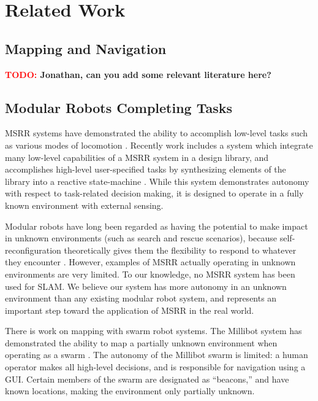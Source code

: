 \documentclass[conference]{IEEEtran}
\newcommand{\TODO}[1]{ {\bf \textcolor{red}{TODO:} #1 }}
\begin{document}

\section{Related Work}\label{sec:related-work}
%

\subsection{Mapping and Navigation}\label{mapping-and-navigation}

\TODO{Jonathan, can you add some relevant literature here?}

\subsection{Modular Robots Completing Tasks}
%
MSRR systems have demonstrated the ability to accomplish low-level tasks such as  various modes of locomotion \cite{Yim1994}.
Recently work includes a system which integrate many low-level capabilities of a MSRR system in a design library, and accomplishes high-level user-specified tasks by synthesizing elements of the library into a reactive state-machine \cite{Jing2016}. While this system demonstrates autonomy with respect to task-related decision making, it is designed to operate in a fully known environment with external sensing.

Modular robots have long been regarded as having the potential to make impact in unknown environments (such as search and rescue scenarios), because  self-reconfiguration theoretically gives them the flexibility to respond to whatever they encounter \cite{Yim2007a,Yim2000}.  However, examples of MSRR actually operating in unknown environments are very limited. To our knowledge, no MSRR system has been used for SLAM. We believe our system has more autonomy in an unknown environment than any existing modular robot system, and represents an important step toward the application of MSRR in the real world.

There is work on mapping with swarm robot systems. The Millibot system has demonstrated the ability to map a partially unknown environment when operating as a swarm \cite{Grabowski2000}. The autonomy of the Millibot swarm is limited: a human operator makes all high-level decisions, and is responsible for navigation using a GUI. Certain members of the swarm are designated as ``beacons,'' and have known locations, making the environment only partially unknown.
\end{document}
